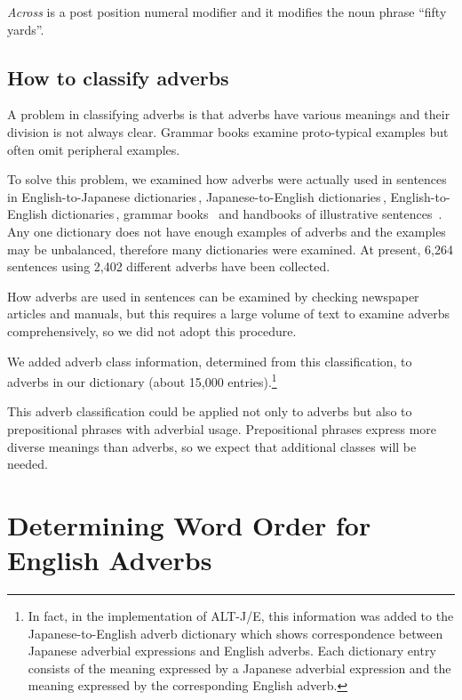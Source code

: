 {\em Across} is a post position numeral modifier and it modifies the noun 
phrase ``fifty yards''.

\subsection{How to classify adverbs}

A problem in classifying adverbs is that adverbs have various meanings and
their division is not always clear. Grammar books examine proto-typical 
examples but often omit peripheral examples.

To solve this problem, 
we examined how adverbs were actually used in sentences 
in  English-to-Japanese dictionaries\,\cite{Takebayashi:90,Konishi:87}, 
Japanese-to-English dictionaries\,\cite{Kojima:90,Kondo:86}, 
English-to-English dictionaries\,\cite{LDOCE}, 
grammar books
\,\cite{Quirk:85,Quirk:72,Greenbaum:83,Leech:75,Okada:85,Hornby:77}
and handbooks of illustrative sentences
\,\cite{Horiguchi:83,Tada:77,Konishi:89}.
Any one dictionary does not have enough examples of adverbs and the examples 
may be unbalanced, therefore many dictionaries were examined. 
At present, 6,264 sentences using 2,402 different adverbs have been collected.

How adverbs are used in sentences can be examined by checking newspaper 
articles and manuals, but this requires a large volume of text to 
examine adverbs comprehensively, so we did not adopt this procedure.

We added adverb class information, determined from this 
classification, to adverbs in our dictionary (about 15,000 entries).\footnote{
In fact, in the implementation of ALT-J/E,
this information was added to the Japanese-to-English adverb dictionary
which shows correspondence between Japanese
adverbial expressions and English adverbs. Each dictionary entry
consists of the meaning expressed by a Japanese adverbial expression
and the meaning expressed by the corresponding English adverb.}

This adverb classification could be applied not only to adverbs but also
to prepositional\mbox{} phrases with adverbial usage. Prepositional phrases
express more diverse meanings than adverbs, so we expect that additional 
classes will be needed.

\section{Determining Word Order for English Adverbs}
\label{sec:method}

